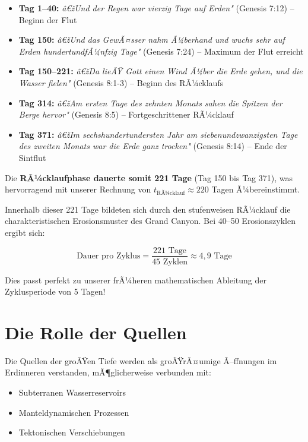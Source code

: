﻿\documentclass[12pt,a4paper]{report}
\begin{document}
\begin{itemize}
	\item \textbf{Tag 1--40:} \textit{â€žUnd der Regen war vierzig Tage auf Erden"} (Genesis 7:12) -- Beginn der Flut
	
	\item \textbf{Tag 150:} \textit{â€žUnd das GewÃ¤sser nahm Ã¼berhand und wuchs sehr auf Erden hundertundfÃ¼nfzig Tage"} (Genesis 7:24) -- Maximum der Flut erreicht
	
	\item \textbf{Tag 150--221:} \textit{â€žDa lieÃŸ Gott einen Wind Ã¼ber die Erde gehen, und die Wasser fielen"} (Genesis 8:1-3) -- Beginn des RÃ¼cklaufs
	
	\item \textbf{Tag 314:} \textit{â€žAm ersten Tage des zehnten Monats sahen die Spitzen der Berge hervor"} (Genesis 8:5) -- Fortgeschrittener RÃ¼cklauf
	
	\item \textbf{Tag 371:} \textit{â€žIm sechshundertundersten Jahr am siebenundzwanzigsten Tage des zweiten Monats war die Erde ganz trocken"} (Genesis 8:14) -- Ende der Sintflut
\end{itemize}

Die \textbf{RÃ¼cklaufphase dauerte somit 221 Tage} (Tag 150 bis Tag 371), was hervorragend mit unserer Rechnung von $t_{\text{RÃ¼cklauf}} \approx 220$ Tagen Ã¼bereinstimmt.

Innerhalb dieser 221 Tage bildeten sich durch den stufenweisen RÃ¼cklauf die charakteristischen Erosionsmuster des Grand Canyon. Bei 40--50 Erosionszyklen ergibt sich:

\begin{equation}
	\text{Dauer pro Zyklus} = \frac{221 \text{ Tage}}{45 \text{ Zyklen}} \approx 4{,}9 \text{ Tage}
\end{equation}

Dies passt perfekt zu unserer frÃ¼heren mathematischen Ableitung der Zyklusperiode von 5 Tagen!

\section{Die Rolle der Quellen}

Die Quellen der groÃŸen Tiefe werden als groÃŸrÃ¤umige Ã–ffnungen im Erdinneren verstanden, mÃ¶glicherweise verbunden mit:

\begin{itemize}
	\item Subterranen Wasserreservoirs
	\item Manteldynamischen Prozessen
	\item Tektonischen Verschiebungen
\end{itemize}
\end{document}
